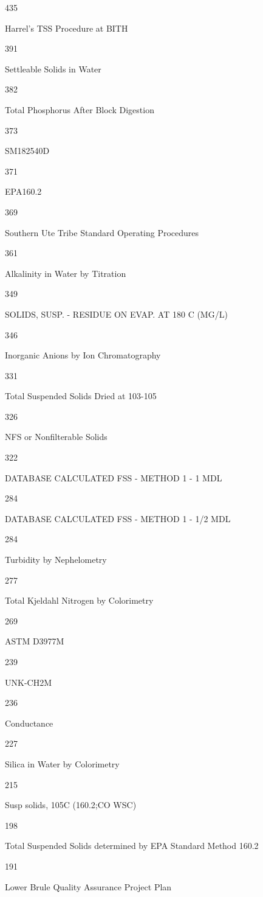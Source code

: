 \documentclass[]{article}
\begin{document}
435

Harrel's TSS Procedure at BITH

391

Settleable Solids in Water

382

Total Phosphorus After Block Digestion

373

SM182540D

371

EPA160.2

369

Southern Ute Tribe Standard Operating Procedures

361

Alkalinity in Water by Titration

349

SOLIDS, SUSP. - RESIDUE ON EVAP. AT 180 C (MG/L)

346

Inorganic Anions by Ion Chromatography

331

Total Suspended Solids Dried at 103-105

326

NFS or Nonfilterable Solids

322

DATABASE CALCULATED FSS - METHOD 1 - 1 MDL

284

DATABASE CALCULATED FSS - METHOD 1 - 1/2 MDL

284

Turbidity by Nephelometry

277

Total Kjeldahl Nitrogen by Colorimetry

269

ASTM D3977M

239

UNK-CH2M

236

Conductance

227

Silica in Water by Colorimetry

215

Susp solids, 105C (160.2;CO WSC)

198

Total Suspended Solids determined by EPA Standard Method 160.2

191

Lower Brule Quality Assurance Project Plan
\end{document}
